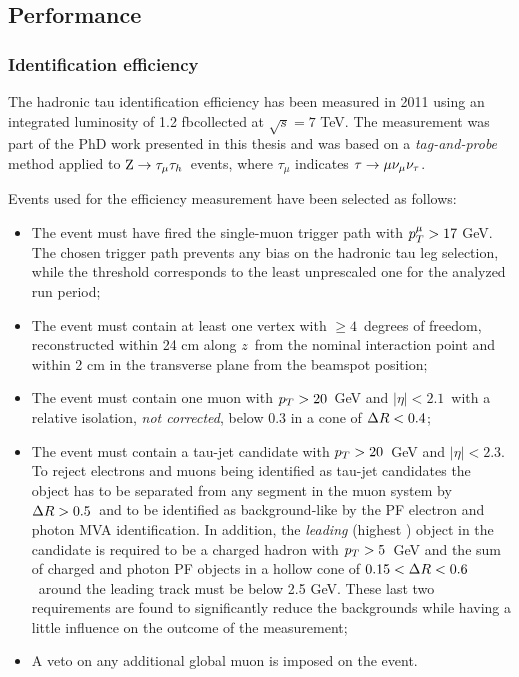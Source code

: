 \subsection{Performance}

\subsubsection{Identification efficiency}
\label{sec:tauid_eff}
The hadronic tau identification efficiency has been measured in 2011 using an integrated luminosity of 1.2 fb\Inv collected at $\sqrt{s}=7$ TeV. 
The measurement was part of the PhD work presented in this thesis and was based on a \emph{tag-and-probe} method applied to $\mathrm{Z}\rightarrow\tau_\mu\tau_h$\ events, where $\tau_\mu$ indicates $\tau\rightarrow\mu\nu_\mu\nu_\tau$. 

Events used for the efficiency measurement have been selected as follows:
\begin{itemize}
\item The event must have fired the single-muon trigger path with $p_{T}^\mu > 17$ GeV. The chosen trigger path prevents any bias on the hadronic tau leg selection, while the \pT threshold corresponds to the least unprescaled one for the analyzed run period;
\item The event must contain at least one vertex with $\geq 4$\ degrees of freedom, reconstructed within 24 cm along $z$\ from the nominal interaction point and within 2 cm in the transverse plane from the beamspot position;
\item The event must contain one muon with $p_{T} > 20$\ GeV and $|\eta| < 2.1$\ with a relative isolation, \emph{not \db corrected}, below 0.3 in a cone of $\Delta R < 0.4$;
\item The event must contain a tau-jet candidate with $p_{T} > 20$\ GeV and $|\eta| < 2.3$. To reject electrons and muons being identified as tau-jet candidates the object has to be separated from any segment in the muon system by $\Delta R > 0.5$\ and to be identified as background-like by the PF electron and photon MVA identification. In addition, the \emph{leading} (highest \pT) object in the candidate is required to be a charged hadron with $p_{T} > 5$\ GeV and the \pT sum of charged and photon PF objects in a hollow cone of $0.15 < \Delta R < 0.6$\ around the leading track must be below 2.5 GeV. These last two requirements are found to significantly reduce the backgrounds while having a little influence on the outcome of the measurement; 
\item A veto on any additional global muon is imposed on the event.
\end{itemize}


